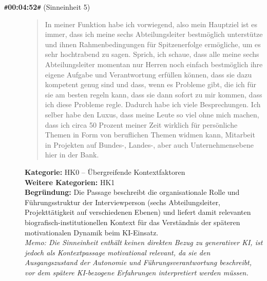 \begin{description}
  \item[\texttt{\#}\textbf{00:04:52}\texttt{\#} (Sinneinheit 5)]
  \begin{quote}
  In meiner Funktion habe ich vorwiegend, also mein Hauptziel ist es immer, dass ich meine sechs Abteilungsleiter bestmöglich unterstütze und ihnen Rahmenbedingungen für Spitzenerfolge ermögliche, um es sehr hochtrabend zu sagen. Sprich, ich schaue, dass alle meine sechs Abteilungsleiter momentan nur Herren noch einfach bestmöglich ihre eigene Aufgabe und Verantwortung erfüllen können, dass sie dazu kompetent genug sind und dass, wenn es Probleme gibt, die ich für sie am besten regeln kann, dass sie dann sofort zu mir kommen, dass ich diese Probleme regle. Dadurch habe ich viele Besprechungen. Ich selber habe den Luxus, dass meine Leute so viel ohne mich machen, dass ich circa 50 Prozent meiner Zeit wirklich für persönliche Themen in Form von beruflichen Themen widmen kann, Mitarbeit in Projekten auf Bundes-, Landes-, aber auch Unternehmensebene hier in der Bank.
  \end{quote}
  \textbf{Kategorie:} HK0 -- Übergreifende Kontextfaktoren\\
  \textbf{Weitere Kategorien:} HK1\\
  \textbf{Begr\"undung:} Die Passage beschreibt die organisationale Rolle und Führungsstruktur der Interviewperson (sechs Abteilungsleiter, Projekttätigkeit auf verschiedenen Ebenen) und liefert damit relevanten biografisch-institutionellen Kontext für das Verständnis der späteren motivationalen Dynamik beim KI-Einsatz.
  \\\textit{Memo: Die Sinneinheit enthält keinen direkten Bezug zu generativer KI, ist jedoch als Kontextpassage motivational relevant, da sie den Ausgangszustand der Autonomie und Führungsverantwortung beschreibt, vor dem spätere KI-bezogene Erfahrungen interpretiert werden müssen.}
\end{description}
\medskip

